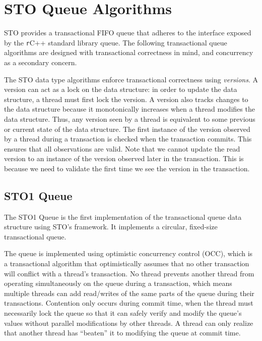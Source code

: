 \section{STO Queue Algorithms}

STO provides a transactional FIFO queue that adheres to the interface exposed by the \texttt
r{C++} standard library queue. The following transactional queue algorithms are designed with transactional correctness in mind, and concurrency as a secondary concern. 

The STO data type algorithms enforce transactional correctness using \emph{versions}. A version can act as a lock on the data structure: in order to update the data structure, a thread must first lock the version. A version also tracks changes to the data structure because it monotonically increases when a thread modifies the data structure. Thus, any version seen by a thread is equivalent to some previous or current state of the data structure. The first instance of the version observed by a thread during a transaction is checked when the transaction commits. This ensures that all observations are valid. Note that we cannot update the read version to an instance of the version observed later in the transaction. This is because we need to validate the first time we see the version in the transaction. 

\subsection{STO1 Queue}
The STO1 Queue is the first implementation of the transactional queue data structure using STO's framework. It implements a circular, fixed-size transactional queue.

The queue is implemented using optimistic concurrency control (OCC), which is a transactional algorithm that optimistically assumes that no other transaction will conflict with a thread's transaction. No thread prevents another thread from operating simultaneously on the queue during a transaction, which means multiple threads can add read/writes of the same parts of the queue during their transactions. Contention only occurs during commit time, when the thread must necessarily lock the queue so that it can safely verify and modify the queue's values without parallel modifications by other threads. A thread can only realize that another thread has “beaten” it to modifying the queue at commit time.

